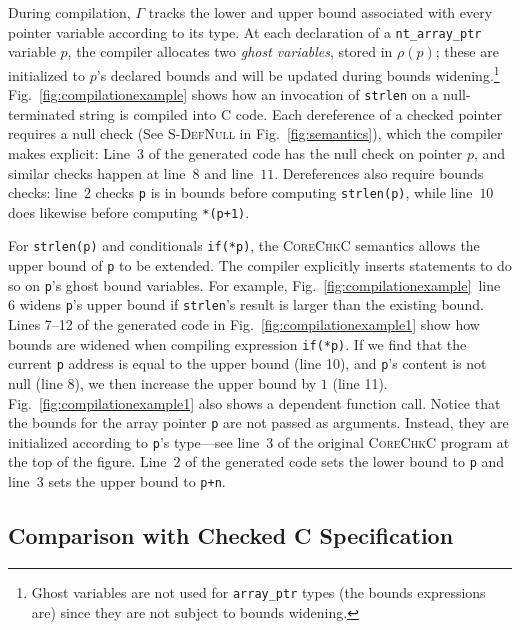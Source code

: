 \documentclass[conference]{IEEEtran}
\newcommand{\code}[1]{\lstinline|#1|}
\newcommand{\lang}{\textsc{CoreChkC}\xspace}
\begin{document}
During compilation, $\Gamma$ tracks the lower and upper bound
associated with every pointer variable according to its type. At each
declaration of a \code{nt_array_ptr} variable $p$, the
compiler allocates two \emph{ghost variables}, 
stored in $\rho(p)$; these are initialized to $p$'s declared bounds
and will be updated during bounds widening.\footnote{Ghost variables
  are not used for \code{array_ptr} types (the bounds expressions are)
  since they are not subject to bounds widening.} 
Fig.~\ref{fig:compilationexample} shows how an invocation of
\code{strlen} on a null-terminated string is compiled into C
code. Each dereference of a checked pointer requires a null check
(See \textsc{S-DefNull} in Fig.~\ref{fig:semantics}), which the
compiler makes explicit: Line~$3$ of the generated code has the null
check on pointer $p$, and similar checks happen at line~$8$ and
line~$11$.
Dereferences also require bounds checks: line~$2$ checks \code{p} is
in bounds before computing \code{strlen(p)}, while line~$10$ does
likewise before computing \code{*(p+1)}.

For \code{strlen(p)} and conditionals \code{if(*p)}, the \lang
semantics allows the upper bound of \code{p} to be extended.
The compiler explicitly inserts statements to do so on \code{p}'s
ghost bound variables. For example,
Fig.~\ref{fig:compilationexample}~line~$6$ widens \code{p}'s upper
bound if \code{strlen}'s result is larger than the existing
bound. 
Lines 7--12 of the generated code in
Fig.~\ref{fig:compilationexample1} show how bounds are 
widened when compiling expression \code{if(*p)}. If we find that the
current \code{p} address is equal to the upper bound (line 10),
and \code{p}'s content is not null (line 8), we then increase the
upper bound by $1$ (line 11).
Fig.~\ref{fig:compilationexample1} also shows a dependent function call.
Notice that the bounds for the array pointer \code{p} are not passed as
arguments. Instead, they are initialized according to \code{p}'s
type---see line~3 of the original \lang program at the top of the figure.
Line~$2$ of the generated code
sets the lower bound  to \code{p} and line~$3$ sets the
upper bound to \code{p+n}.

\subsection{Comparison with Checked C Specification}
\label{sec:disc}
\end{document}
